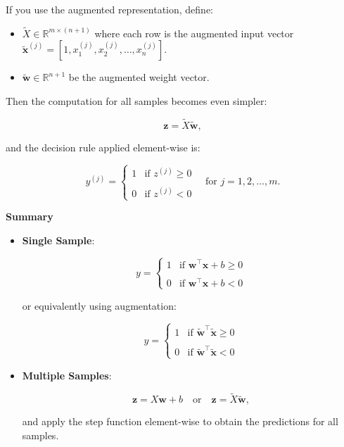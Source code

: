 \documentclass[11pt]{article}
\providecommand{\tightlist}{%
      \setlength{\itemsep}{0pt}\setlength{\parskip}{0pt}}
\begin{document}
If you use the augmented representation, define:

\begin{itemize}
\tightlist
\item
  $\tilde{X} \in \mathbb{R}^{m \times (n+1)}$ where each row is the
  augmented input vector
  $\tilde{\mathbf{x}}^{(j)} = [1, x_1^{(j)}, x_2^{(j)}, \dots, x_n^{(j)}]$.
\item
  $\tilde{\mathbf{w}} \in \mathbb{R}^{n+1}$ be the augmented weight
  vector.
\end{itemize}

Then the computation for all samples becomes even simpler:

$$
\mathbf{z} = \tilde{X} \tilde{\mathbf{w}},
$$

and the decision rule applied element-wise is:

$$
y^{(j)} = \begin{cases} 
1 & \text{if } z^{(j)} \geq 0 \\
& \\
0 & \text{if } z^{(j)} < 0
\end{cases}
\quad \text{for } j = 1, 2, \ldots, m.
$$

\textbf{Summary}

\begin{itemize}
\item
  \textbf{Single Sample}:

  $$
  y = \begin{cases} 
  1 & \text{if } \mathbf{w}^\top \mathbf{x} + b \geq 0 \\
  & \\
  0 & \text{if } \mathbf{w}^\top \mathbf{x} + b < 0
  \end{cases}
  $$

  or equivalently using augmentation:

  $$
  y = \begin{cases} 
  1 & \text{if } \tilde{\mathbf{w}}^\top \tilde{\mathbf{x}} \geq 0 \\
  & \\
  0 & \text{if } \tilde{\mathbf{w}}^\top \tilde{\mathbf{x}} < 0
  \end{cases}
  $$
\item
  \textbf{Multiple Samples}:

  $$
  \mathbf{z} = X \mathbf{w} + b \quad \text{or} \quad \mathbf{z} = \tilde{X} \tilde{\mathbf{w}},
  $$

  and apply the step function element-wise to obtain the predictions for
  all samples.
\end{itemize}
\end{document}

